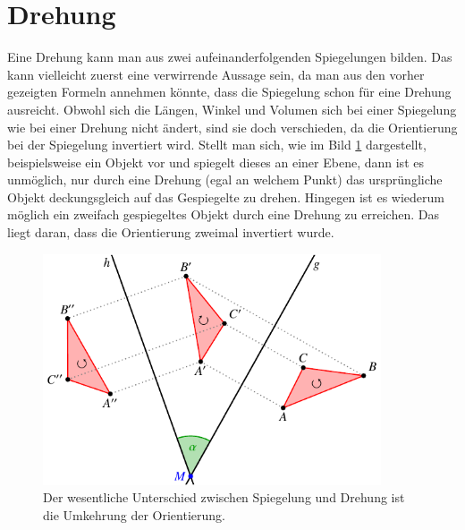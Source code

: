%
%
%
\section{Drehung
\label{clifford:section:drehung}}

Eine Drehung kann man aus zwei aufeinanderfolgenden Spiegelungen bilden.
Das kann vielleicht zuerst eine verwirrende Aussage sein, da man aus den vorher gezeigten Formeln annehmen könnte, dass die Spiegelung schon für eine Drehung ausreicht.
Obwohl sich die Längen, Winkel und Volumen sich bei einer Spiegelung wie bei einer Drehung nicht ändert, sind sie doch verschieden, da die Orientierung bei der Spiegelung invertiert wird.
Stellt man sich, wie im Bild \ref{BildSpiegRot} dargestellt, beispielsweise ein Objekt vor und spiegelt dieses an einer Ebene, dann ist es unmöglich, nur durch eine Drehung (egal an welchem Punkt) das ursprüngliche Objekt deckungsgleich auf das Gespiegelte zu drehen.
Hingegen ist es wiederum möglich ein zweifach gespiegeltes Objekt durch eine Drehung zu erreichen.
Das liegt daran, dass die Orientierung zweimal invertiert wurde.
%
%

\begin{figure}
	\centering
	\includegraphics[width=10cm]{papers/clifford/images/spiegelung.pdf}
	\caption{Der wesentliche Unterschied zwischen Spiegelung und Drehung ist die Umkehrung der Orientierung.}
	\label{BildSpiegRot}
\end{figure}


